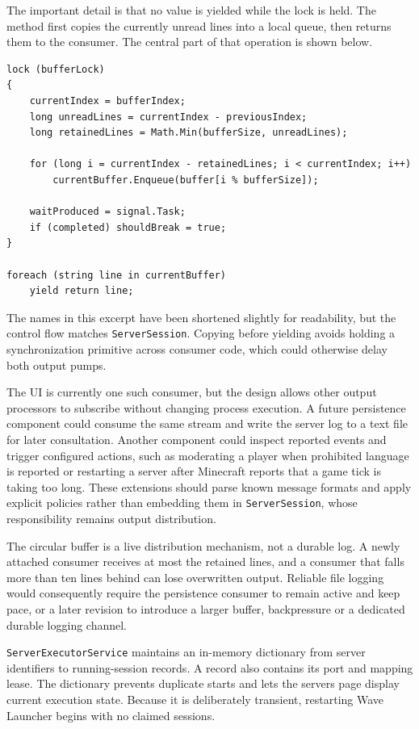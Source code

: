 The important detail is that no value is yielded while the lock is held. The method first copies the currently unread lines into a local queue, then returns them to the consumer. The central part of that operation is shown below.

\begin{footnotesize}
\begin{verbatim}
lock (bufferLock)
{
    currentIndex = bufferIndex;
    long unreadLines = currentIndex - previousIndex;
    long retainedLines = Math.Min(bufferSize, unreadLines);

    for (long i = currentIndex - retainedLines; i < currentIndex; i++)
        currentBuffer.Enqueue(buffer[i % bufferSize]);

    waitProduced = signal.Task;
    if (completed) shouldBreak = true;
}

foreach (string line in currentBuffer)
    yield return line;
\end{verbatim}
\end{footnotesize}

The names in this excerpt have been shortened slightly for readability, but the control flow matches \texttt{ServerSession}. Copying before yielding avoids holding a synchronization primitive across consumer code, which could otherwise delay both output pumps.

The UI is currently one such consumer, but the design allows other output processors to subscribe without changing process execution. A future persistence component could consume the same stream and write the server log to a text file for later consultation. Another component could inspect reported events and trigger configured actions, such as moderating a player when prohibited language is reported or restarting a server after Minecraft reports that a game tick is taking too long. These extensions should parse known message formats and apply explicit policies rather than embedding them in \texttt{ServerSession}, whose responsibility remains output distribution.

The circular buffer is a live distribution mechanism, not a durable log. A newly attached consumer receives at most the retained lines, and a consumer that falls more than ten lines behind can lose overwritten output. Reliable file logging would consequently require the persistence consumer to remain active and keep pace, or a later revision to introduce a larger buffer, backpressure or a dedicated durable logging channel.

\texttt{ServerExecutorService} maintains an in-memory dictionary from server identifiers to running-session records. A record also contains its port and mapping lease. The dictionary prevents duplicate starts and lets the servers page display current execution state. Because it is deliberately transient, restarting Wave Launcher begins with no claimed sessions.

